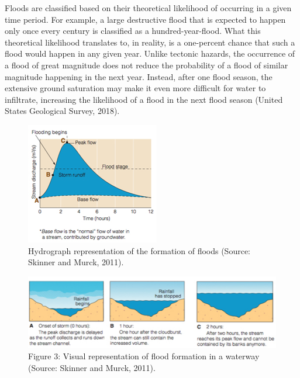 Floods are classified based on their theoretical likelihood of occurring in a given time period. For example, a large destructive flood that is expected to happen only once every century is classified as a hundred-year-flood. What this theoretical likelihood translates to, in reality, is a one-percent chance that such a flood would happen in any given year. Unlike tectonic hazards, the occurrence of a flood of great magnitude does not reduce the probability of a flood of similar magnitude happening in the next year. Instead, after one flood season, the extensive ground saturation may make it even more difficult for water to infiltrate, increasing the likelihood of a flood in the next flood season (United States Geological Survey, 2018). 

\begin{figure}[h]
	\centering
		\includegraphics[width=.5\textwidth]{graphics/base_flow.jpg}
	\caption{Hydrograph representation of the formation of floods (Source: Skinner and Murck, 2011).}
	\label{fig:base_flow}
\end{figure}
 
\begin{figure}[hb]
	\centering
		\includegraphics[width=1.00\textwidth]{graphics/hydrograph.jpg}
	\caption{Figure 3: Visual representation of flood formation in a waterway (Source: Skinner and Murck, 2011).}
	\label{fig:hydrograph}
\end{figure}
  

